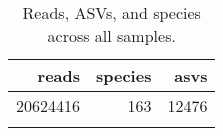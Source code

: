 \begin{longtable}{rrr}
  \hline
reads & species & asvs \\ 
  \hline
20624416 & 163 & 12476 \\ 
   \hline
\hline
\caption{Reads, ASVs, and species across all samples.} 
\label{table:stats}
\end{longtable}
